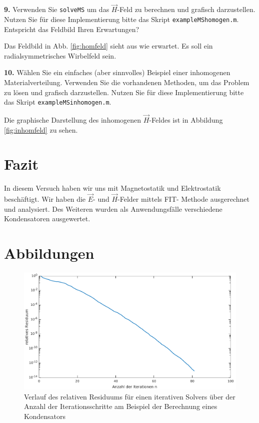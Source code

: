 \documentclass[Protokollheft.tex]{subfiles}
\begin{document}
\begin{framed}
	\noindent \textbf{9.} Verwenden Sie \lstinline{solveMS} um das $\vec{H}$-Feld zu berechnen und grafisch darzustellen. Nutzen Sie für diese Implementierung bitte das Skript \lstinline{exampleMShomogen.m}. Entspricht das Feldbild Ihren Erwartungen?\label{exer:visualizeHfield}
\end{framed}
\noindent
Das Feldbild in Abb. \ref{fig:homfeld} sieht aus wie erwartet. Es soll ein radialsymmetrisches Wirbelfeld sein.

\begin{framed}
	\noindent \textbf{10.} Wählen Sie ein einfaches (aber sinnvolles) Beispiel einer inhomogenen Materialverteilung. Verwenden Sie die vorhandenen Methoden, um das
Problem zu lösen und grafisch darzustellen. Nutzen Sie für diese Implementierung bitte das Skript \lstinline{exampleMSinhomogen.m}.\label{exer:Hfield4inhomogenMaterial}
\end{framed}
\noindent
Die graphische Darstellung des inhomogenen $\vec{H}$-Feldes ist in Abbildung \ref{fig:inhomfeld} zu sehen.



\section{Fazit}
In diesem Versuch haben wir uns mit Magnetostatik und Elektrostatik beschäftigt. Wir haben die $\vec{E}$- und $\vec{H}$-Felder mittels FIT- Methode ausgerechnet und analysiert. Des Weiteren wurden als Anwendungsfälle verschiedene Kondensatoren ausgewertet.

\clearpage
\newpage
\section{Abbildungen}
\begin{figure}[h!]
	\centering
	\includegraphics[width=0.7\linewidth]{ResidiumIterationenGraph.pdf}
	\caption{Verlauf des relativen Residuums für einen iterativen Solvers über der Anzahl der Iterationsschritte am Beispiel der Berechnung eines Kondensators}
	\label{fig:residiumiIterationen}
\end{figure}
\end{document}
